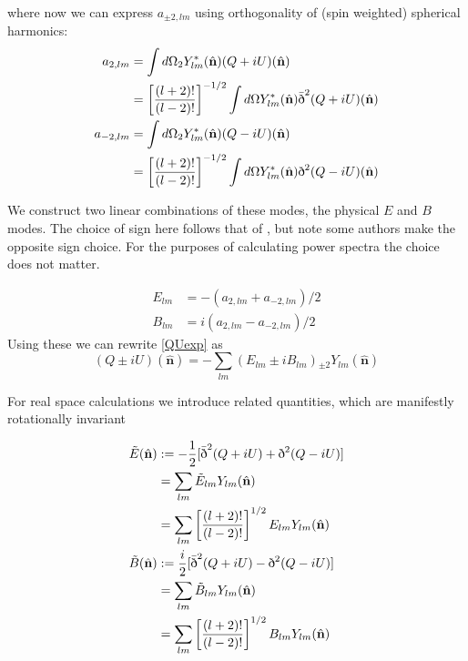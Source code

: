 \documentclass[a4paper,10pt]{article}
\renewcommand{\v}[1]{\mathbf{#1}}
\newcommand{\half}{\frac{1}{2}}
\newcommand{\unit}[1]{\hat{\v{#1}}}
\newcommand{\sr}{\text{\normalfont\dh}}
\renewcommand{\sl}{\bar{\text{\normalfont\dh}}}
\newcommand{\ltwo}{\left[\frac{(l+2)!}{(l-2)!}\right]}
\begin{document}
where now we can express $a_{\pm2,lm}$ using orthogonality of (spin weighted) spherical harmonics:
\begin{equation}\begin{split}
a_{2,lm} &= \int d\Omega {}_2Y_{lm}^*(\unit{n})(Q+iU)(\unit{n})\\
&= \ltwo^{-1/2}\int d\Omega Y_{lm}^*(\unit{n})\sl^2(Q+iU)(\unit{n})\\
a_{-2,lm} &= \int d\Omega {}_2Y_{lm}^*(\unit{n})(Q-iU)(\unit{n})\\
&= \ltwo^{-1/2}\int d\Omega Y_{lm}^*(\unit{n})\sr^2(Q-iU)(\unit{n})
\end{split}\end{equation}

We construct two linear combinations of these modes, the physical $E$ and $B$ modes. The choice of sign here follows that of \cite{all-sky}, but note some authors make the opposite sign choice. For the purposes of calculating power spectra the choice does not matter.

\begin{equation}\begin{split} 
E_{lm} &= -(a_{2,lm} + a_{-2,lm})/2\\
B_{lm} &= i(a_{2,lm} - a_{-2,lm})/2
\end{split}\end{equation}
Using these we can rewrite \ref{QUexp} as 
\begin{equation}
(Q\pm iU)(\unit{n}) = -\sum_{lm} (E_{lm} \pm i B_{lm}) {}_{\pm2}Y_{lm}(\unit{n})
\label{QUEB}
\end{equation}

For real space calculations we introduce related quantities, which are manifestly rotationally invariant

\begin{equation}\begin{split}
\tilde{E}(\unit{n}) &:= -\half[\sl^2(Q+iU) + \sr^2(Q-iU)]\\
&= \sum_{lm} \tilde{E}_{lm}Y_{lm}(\unit{n})\\
&= \sum_{lm} \ltwo^{1/2}E_{lm}Y_{lm}(\unit{n})\\
\tilde{B}(\unit{n}) &:= \frac{i}{2}[\sl^2(Q+iU) - \sr^2(Q-iU)]\\
&= \sum_{lm} \tilde{B}_{lm}Y_{lm}(\unit{n})\\
&= \sum_{lm} \ltwo^{1/2}B_{lm}Y_{lm}(\unit{n})
\label{EBmodes}
\end{split}\end{equation}
\end{document}
